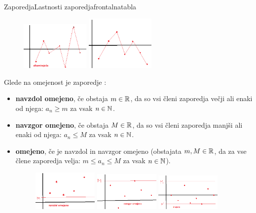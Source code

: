 \begin{priprava}{}{}{Zaporedja}{Lastnosti zaporedja}{frontalna}{tabla}
\newpage

\begin{figure}[h]
    \centering
    \includegraphics[width=0.3\textwidth]{slike/alternirajoče.png}
    \includegraphics[width=0.3\textwidth]{slike/grdo_zaporedje.png}
\end{figure}

Glede na omejenost je zaporedje :
\begin{itemize}
    \item \textbf{navzdol omejeno}, če obstaja $ m \in \mathbb{R} $, da so vsi členi zaporedja večji ali enaki od njega: $ a_n \geq m $ za vsak $ n \in \mathbb{N} $.
    \item \textbf{navzgor omejeno}, če obstaja $ M \in \mathbb{R} $, da so vsi členi zaporedja manjši ali enaki od njega: $ a_n \leq M $ za vsak $ n \in \mathbb{N} $.
    \item \textbf{omejeno}, če je navzdol in navzgor omejeno (obstajata $ m, M \in \mathbb{R} $, da za vse člene zaporedja velja: $ m \leq a_n \leq M $ za vsak $ n \in \mathbb{N} $).
    \begin{figure}[h]
        \centering
        \includegraphics[width=0.3\textwidth]{slike/navzdol.png}
        \includegraphics[width=0.3\textwidth]{slike/navzgor.png}
        \includegraphics[width=0.3\textwidth]{slike/omejeno.png}
    \end{figure}
\end{itemize}


\end{priprava}
